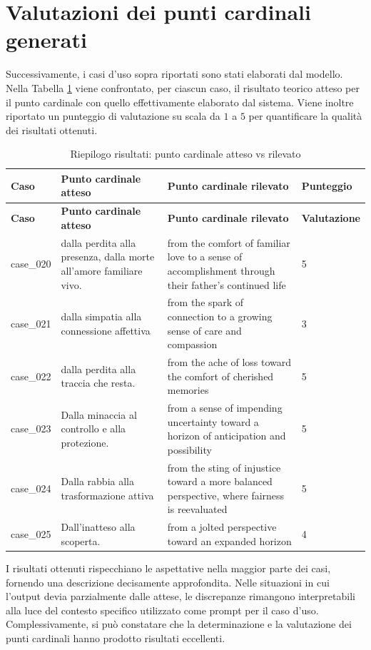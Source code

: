 \documentclass[11pt]{report}
\begin{document}
\section{Valutazioni dei punti cardinali generati}

Successivamente, i casi d'uso sopra riportati sono stati elaborati dal modello. Nella Tabella \ref{tab:cardinal_result} viene confrontato, per ciascun caso, il risultato teorico atteso per il punto cardinale con quello effettivamente elaborato dal sistema. Viene inoltre riportato un punteggio di valutazione su scala da $1$ a $5$ per quantificare la qualità dei risultati ottenuti.

\begin{longtable}[width=\textwidth]{|p{}p{}p{}p{}|}
    \caption{Riepilogo risultati: punto cardinale atteso vs rilevato} 
    \label{tab:cardinal_result} \\
    \toprule
    \textbf{Caso} & \textbf{Punto cardinale atteso} & \textbf{Punto cardinale rilevato} & \textbf{Punteggio} \\
    \midrule
    \endfirsthead
    \toprule
    \textbf{Caso} & \textbf{Punto cardinale atteso} & \textbf{Punto cardinale rilevato} & \textbf{Valutazione} \\
    \midrule
    \endhead
    case\_020 & dalla perdita alla presenza, dalla morte all'amore familiare vivo. & from the comfort of familiar love to a sense of accomplishment through their father's continued life & 5 \\
    case\_021 & dalla simpatia alla connessione affettiva & from the spark of connection to a growing sense of care and compassion & 3 \\
    case\_022 & dalla perdita alla traccia che resta. & from the ache of loss toward the comfort of cherished memories & 5 \\
    case\_023 & Dalla minaccia al controllo e alla protezione. & from a sense of impending uncertainty toward a horizon of anticipation and possibility & 5 \\
    case\_024 & Dalla rabbia alla trasformazione attiva & from the sting of injustice toward a more balanced perspective, where fairness is reevaluated & 5 \\
    case\_025 & Dall'inatteso alla scoperta. & from a jolted perspective toward an expanded horizon & 4\\
    \bottomrule
\end{longtable}

I risultati ottenuti rispecchiano le aspettative nella maggior parte dei casi, fornendo una descrizione decisamente approfondita. Nelle situazioni in cui l'output devia parzialmente dalle attese, le discrepanze rimangono interpretabili alla luce del contesto specifico utilizzato come prompt per il caso d'uso. Complessivamente, si può constatare che la determinazione e la valutazione dei punti cardinali hanno prodotto risultati eccellenti.
 
\end{document}

